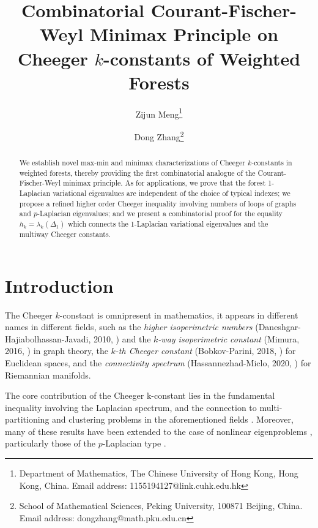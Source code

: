 \documentclass[12pt, reqno]{article}
\title{Combinatorial Courant-Fischer-Weyl Minimax Principle on %
Cheeger $k$-constants of Weighted Forests}
\author{Zijun Meng\thanks{Department of Mathematics, The Chinese University of Hong Kong,
Hong Kong, China. Email address: 1155194127@link.cuhk.edu.hk} \and Dong Zhang\thanks{School of Mathematical Sciences, Peking University,
100871 Beijing, China. Email address: dongzhang@math.pku.edu.cn}}
\date{}
\begin{document}
\maketitle

\begin{abstract}
We establish novel max-min and minimax characterizations of Cheeger $k$-constants in weighted forests, thereby providing the first combinatorial analogue of the Courant-\\Fischer-Weyl minimax principle. As for applications, we prove that the forest 1-Laplacian variational eigenvalues are independent of the choice of typical indexes; we propose a refined higher order Cheeger inequality involving numbers of loops of graphs and $p$-Laplacian eigenvalues; %
and we present a combinatorial proof for the equality $h_k=\lambda_k(\Delta_1)$ which connects the 1-Laplacian variational eigenvalues and the multiway Cheeger constants. 
\end{abstract}
\tableofcontents

\section{Introduction}
The Cheeger $k$-constant is omnipresent in mathematics, it appears in different names in different fields, such as the \emph{higher isoperimetric numbers} (Daneshgar-Hajiabolhassan-Javadi, 2010, \cite{Daneshgar-Hajiabolhassan-Javadi}) and the \emph{$k$-way isoperimetric constant} (Mimura, 2016, \cite{Mimura}) in graph theory, the \emph{$k$-th Cheeger constant} (Bobkov-Parini, 2018, \cite{Bobkov-Parini}) for Euclidean spaces, and the \emph{connectivity spectrum} (Hassannezhad-Miclo, 2020, \cite{Hassannezhad-Miclo}) for Riemannian manifolds. %

The core contribution of the Cheeger k-constant lies in the fundamental inequality involving the Laplacian spectrum, and the connection to multi-partitioning and clustering problems in the aforementioned fields \cite{Lee-Gharan-Trevisan,Hassannezhad-Miclo}. Moreover, many of these results have been extended to the case of nonlinear eigenproblems \cite{Bungert}, particularly those of the $p$-Laplacian type \cite{Tudisco,Keller}.  %
\end{document}
